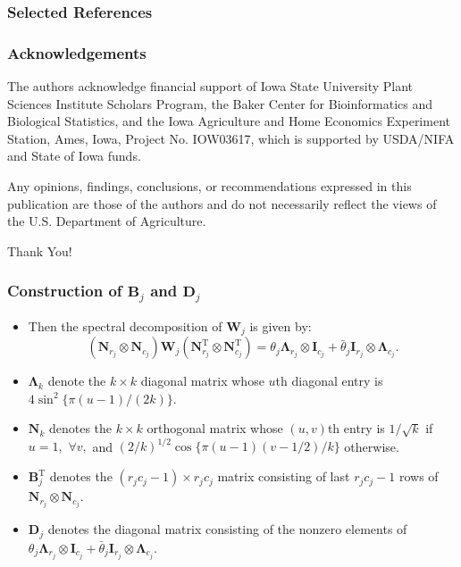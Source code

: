\documentclass{beamer}
\newcommand{\bB}{\mathbf{B}}
\newcommand{\bD}{\mathbf{D}}
\newcommand{\bLambda}{{\bm\Lambda}}
\newcommand{\bN}{\mathbf{N}}
\newcommand{\bW}{\mathbf{W}}
\newcommand{\sT}{\mathrm{T}}
\begin{document}
\begin{frame}
\frametitle{Selected References}


\end{frame}



\begin{frame}
\frametitle{Acknowledgements}
The authors acknowledge financial support of Iowa State University Plant Sciences Institute Scholars Program, the Baker Center for Bioinformatics and Biological Statistics, and the Iowa Agriculture and Home Economics Experiment Station, Ames, Iowa, Project No. IOW03617, which is supported by USDA/NIFA and State of Iowa funds. 


Any opinions, findings, conclusions, or recommendations expressed in this publication are those of the authors and do not necessarily reflect the views of the U.S. Department of Agriculture.
\end{frame}




\begin{frame}%
\begin{center}
\Huge Thank You!
\end{center}
\end{frame}




\begin{frame}
	\frametitle{Construction of $\bB_{j}$ and $\bD_j$}

  	\begin{itemize}
         \item Then the spectral decomposition of $\bW_j$ is given by:
         $$( \bN_{r_j}\otimes\bN_{c_j}) \bW_j ( \bN_{r_j}^\sT \otimes\bN_{c_j}^\sT) = \theta_j\bLambda_{r_j}\otimes\mathbf{I}_{c_j} + \bar\theta_j\mathbf{I}_{r_j}\otimes\bLambda_{c_j}.$$
         \item $\bLambda_k$ denote the $k\times k$ diagonal matrix  whose $u$th diagonal entry is $4\sin^2\{\pi(u-1)/(2k)\}.$
	\item $\bN_k$ denotes the $k\times k$ orthogonal matrix whose $(u,v)$th entry is $1/\sqrt{k}$ if $u=1,$ $\forall v,$ and $(2/k)^{1/2}\cos\{\pi(u-1)(v-1/2)/k\}$ otherwise.
	\item  $\bB_{j}^{\sT}$ denotes the $(r_jc_j-1)\times r_jc_j$ matrix consisting of last $r_jc_j-1$ rows of $ \bN_{r_j}\otimes\bN_{c_j}$.
         \item $\bD_j$ denotes the diagonal matrix consisting of the nonzero elements of $\theta_j\bLambda_{r_j}\otimes\mathbf{I}_{c_j} + \bar\theta_j\mathbf{I}_{r_j}\otimes\bLambda_{c_j}$.
	\end{itemize}
	
\end{frame}
\end{document}
